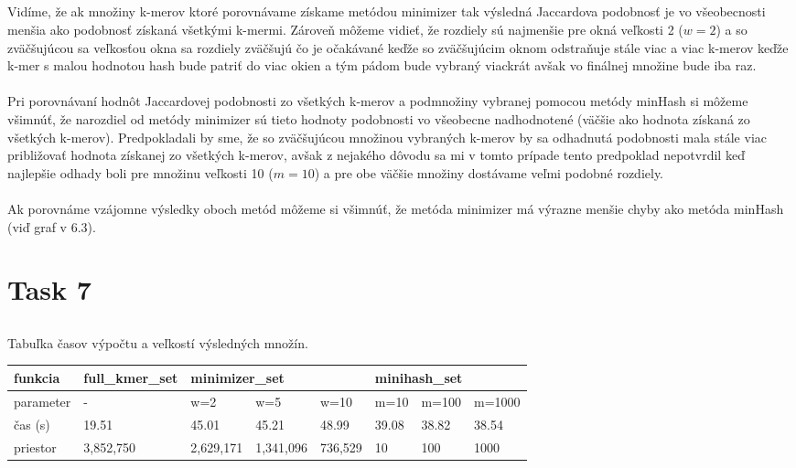 \documentclass[a4paper]{article}
\begin{document}
\subsection{}

Vidíme, že ak množiny k-merov ktoré porovnávame získame metódou minimizer tak výsledná Jaccardova podobnosť je vo všeobecnosti menšia ako podobnosť získaná všetkými k-mermi. Zároveň môžeme vidieť, že rozdiely sú najmenšie pre okná veľkosti 2 ($w=2$) a so zväčšujúcou sa veľkosťou okna sa rozdiely zväčšujú čo je očakávané keďže so zväčšujúcim oknom odstraňuje stále viac a viac k-merov keďže k-mer s malou hodnotou hash bude patriť do viac okien a tým pádom bude vybraný viackrát avšak vo finálnej množine bude iba raz.
\\
\\
Pri porovnávaní hodnôt Jaccardovej podobnosti zo všetkých k-merov a podmnožiny vybranej pomocou metódy minHash si môžeme všimnúť, že narozdiel od metódy minimizer sú tieto hodnoty podobnosti vo všeobecne nadhodnotené (väčšie ako hodnota získaná zo všetkých k-merov). Predpokladali by sme, že so zväčšujúcou množinou vybraných k-merov by sa odhadnutá podobnosti mala stále viac približovať hodnota získanej zo všetkých k-merov, avšak z nejakého dôvodu sa mi v tomto prípade tento predpoklad nepotvrdil keď najlepšie odhady boli pre množinu veľkosti 10 ($m=10$) a pre obe väčšie množiny dostávame veľmi podobné rozdiely.
\\
\\
Ak porovnáme vzájomne výsledky oboch metód môžeme si všimnúť, že metóda minimizer má výrazne menšie chyby ako metóda minHash (viď graf v 6.3).

\section{Task 7} 

\subsection{}
\subsection{}
\subsection{}
Tabuľka časov výpočtu a veľkostí výsledných množín.
\begin{table}[!h]
	\begin{tabular}{|l|l|l|l|l|l|l|l|}
		\hline
		funkcia  & full\_kmer\_set  & \multicolumn{3}{|l|}{minimizer\_set}   & \multicolumn{3}{|l|}{minihash\_set}   \\ \hline
		parameter & -  & w=2   & w=5    & w=10    & m=10   & m=100 & m=1000   \\ \hline
		čas (s) & 19.51 & 45.01 & 45.21 & 48.99 & 39.08 & 38.82 & 38.54\\ \hline
		priestor & 3,852,750 & 2,629,171 & 1,341,096 & 736,529 & 10 & 100 & 1000 \\ \hline
	\end{tabular}
\end{table}
\end{document}
